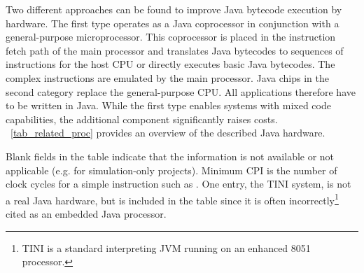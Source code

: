 
Two different approaches can be found to improve Java bytecode
execution by hardware. The first type operates as a Java coprocessor
in conjunction with a general-purpose microprocessor. This
coprocessor is placed in the instruction fetch path of the main
processor and translates Java bytecodes to sequences of instructions
for the host CPU or directly executes basic Java bytecodes. The
complex instructions are emulated by the main processor. Java chips
in the second category replace the general-purpose CPU. All
applications therefore have to be written in Java. While the first
type enables systems with mixed code capabilities, the additional
component significantly raises costs.
\tablename~\ref{tab_related_proc} provides an overview of the
described Java hardware.

Blank fields in the table indicate that the information is not
available or not applicable (e.g. for simulation-only projects).
Minimum CPI is the number of clock cycles for a simple instruction
such as . One entry, the TINI system, is not a real Java
hardware, but is included in the table since it is often
incorrectly\footnote{TINI is a standard interpreting JVM running on
an enhanced 8051 processor.} cited as an embedded Java processor.


